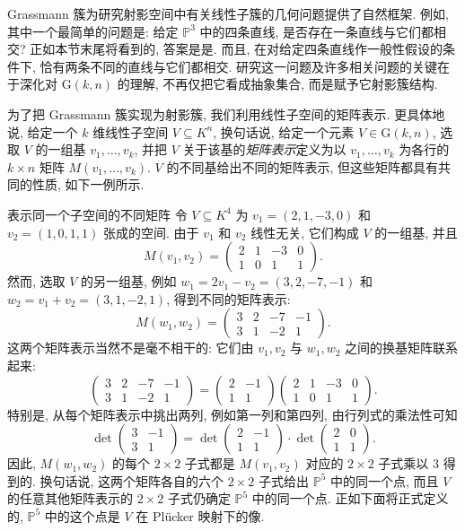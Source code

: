 Grassmann 簇为研究射影空间中有关线性子簇的几何问题提供了自然框架. 例如, 其中一个最简单的问题是: 给定 $\mathbb{P}^{3}$ 中的四条直线, 是否存在一条直线与它们都相交? 正如本节末尾将看到的, 答案是\textquotedbl{}是\textquotedbl{}. 而且, 在对给定四条直线作一般性假设的条件下, 恰有两条不同的直线与它们都相交. 研究这一问题及许多相关问题的关键在于深化对 $\mathrm{G}(k,n)$ 的理解, 不再仅把它看成抽象集合, 而是赋予它射影簇结构.

为了把 Grassmann 簇实现为射影簇, 我们利用线性子空间的矩阵表示. 更具体地说, 给定一个 $k$ 维线性子空间 $V\subseteq K^{n}$, 换句话说, 给定一个元素 $V\in\mathrm{G}(k,n)$, 选取 $V$ 的一组基 $v_{1},\ldots,v_{k}$, 并把 $V$ 关于该基的\emph{矩阵表示}定义为以 $v_{1},\ldots,v_{k}$ 为各行的 $k\times n$ 矩阵 $M(v_{1},\ldots,v_{k})$. $V$ 的不同基给出不同的矩阵表示, 但这些矩阵都具有共同的性质, 如下一例所示.

\begin{Example}{表示同一个子空间的不同矩阵}\leavevmode\label{ex:matrix-representations-of-same-plane}
令 $V\subseteq K^{4}$ 为 $v_{1}=(2,1,-3,0)$ 和 $v_{2}=(1,0,1,1)$ 张成的空间. 由于 $v_{1}$ 和 $v_{2}$ 线性无关, 它们构成 $V$ 的一组基, 并且
\[
  M(v_{1},v_{2})=\begin{pmatrix}
    2&1&-3&0\\
    1&0&1&1
  \end{pmatrix}.
\]
然而, 选取 $V$ 的另一组基, 例如 $w_{1}=2v_{1}-v_{2}=(3,2,-7,-1)$ 和 $w_{2}=v_{1}+v_{2}=(3,1,-2,1)$, 得到不同的矩阵表示:
\[
  M(w_{1},w_{2})=\begin{pmatrix}
    3&2&-7&-1\\
    3&1&-2&1
  \end{pmatrix}.
\]
这两个矩阵表示当然不是毫不相干的: 它们由 $v_{1},v_{2}$ 与 $w_{1},w_{2}$ 之间的换基矩阵联系起来:
\[
  \begin{pmatrix}3&2&-7&-1\\3&1&-2&1\end{pmatrix}
  =\begin{pmatrix}2&-1\\1&1\end{pmatrix}
   \begin{pmatrix}2&1&-3&0\\1&0&1&1\end{pmatrix}.
\]
特别是, 从每个矩阵表示中挑出两列, 例如第一列和第四列, 由行列式的乘法性可知
\[
  \det\begin{pmatrix}3&-1\\3&1\end{pmatrix}
  =\det\begin{pmatrix}2&-1\\1&1\end{pmatrix}
   \cdot\det\begin{pmatrix}2&0\\1&1\end{pmatrix}.
\]
因此, $M(w_{1},w_{2})$ 的每个 $2\times2$ 子式都是 $M(v_{1},v_{2})$ 对应的 $2\times2$ 子式乘以 $3$ 得到的. 换句话说, 这两个矩阵各自的六个 $2\times2$ 子式给出 $\mathbb{P}^{5}$ 中的同一个点, 而且 $V$ 的任意其他矩阵表示的 $2\times2$ 子式仍确定 $\mathbb{P}^{5}$ 中的同一个点. 正如下面将正式定义的, $\mathbb{P}^{5}$ 中的这个点是 $V$ 在 Plücker 映射下的像.
\end{Example}

